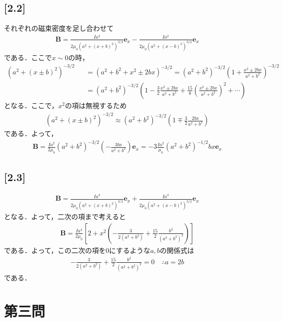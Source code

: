 \documentclass[12pt,dvipdfmx]{jsarticle}
\begin{document}
\subsection*{\large{[2.2]}}
それぞれの磁束密度を足し合わせて
\begin{eqnarray}
  \bm{B} = \frac{I a^2}{2\mu_0(a^2+(x+b)^2)^{3/2}}\bm{e}_x -\frac{I a^2}{2\mu_0(a^2+(x-b)^2)^{3/2}}\bm{e}_x
\end{eqnarray}
である．ここで$x\sim 0$の時，
\begin{eqnarray}
  (a^2 +(x\pm b)^2)^{-3/2} &&= ( a^2 + b^2 + x^2 \pm 2bx) ^{-3/2} = (a^2 + b^2 )^{-3/2} \left( 1 + \frac{x^2 \pm 2bx}{a^2+b^2} \right)^{-3/2}\\
  &&= (a^2 + b^2 )^{-3/2}\left( 1 - \frac{3}{2} \frac{x^2 \pm 2bx}{a^2+b^2} + \frac{15}{8} \left(\frac{x^2 \pm 2bx}{a^2+b^2}\right)^{2} +\cdots \right)
\end{eqnarray}
となる．ここで，$x^2$の項は無視するため
\begin{eqnarray}
  (a^2 +(x\pm b)^2)^{-3/2} \approx (a^2 + b^2 )^{-3/2} \left( 1\mp \frac{3}{2}\frac{2bx}{a^2+b^2} \right)
\end{eqnarray}
である．よって，
\begin{eqnarray}
  \bm{B} = \frac{I a^2}{2\mu_0}(a^2 + b^2 )^{-3/2} \left( -\frac{3bx}{a^2+b^2} \right)\bm{e}_x = -3 \frac{Ia^2}{\mu_0}(a^2+b^2)^{-1/2}bx\bm{e}_x
\end{eqnarray}
\subsection*{\large{[2.3]}}
\begin{eqnarray}
  \bm{B} = \frac{I a^3}{2\mu_0(a^2+(x+b)^2)^{3/2}}\bm{e}_x +\frac{I a^3}{2\mu_0(a^2+(x-b)^2)^{3/2}}\bm{e}_x
\end{eqnarray}
となる．よって，二次の項まで考えると
\begin{eqnarray}
  \bm{B} = \frac{Ia^3}{2\mu_0}\left[ 2 + x^2\left( -\frac{3}{2(a^2+b^2)} + \frac{15}{2}\frac{b^2}{(a^2+b^2)^2} \right) \right]
\end{eqnarray}
である．よって，この二次の項を$0$にするような$a,b$の関係式は
\begin{eqnarray}
  -\frac{3}{2(a^2+b^2)} + \frac{15}{2}\frac{b^2}{(a^2+b^2)^2}=0 \quad\therefore a =2b
\end{eqnarray}
である．
\newpage
\section*{\Large{第三問}}
\end{document}
